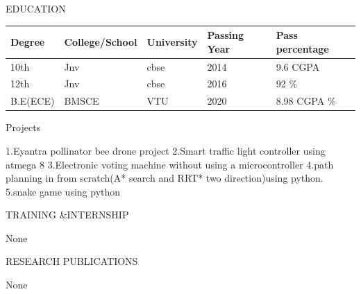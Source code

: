 \documentclass[10pt]{article}
\begin{document}
	\begin{minipage}[t][2cm][t]{0.2\textwidth}
	EDUCATION
		
	\end{minipage}
	\begin{minipage}[t][2cm][t]{0.8\textwidth}
		
	\begin{tabular}{ | l |  l |  l |  l |  l |} 
	\hline
	Degree & College/School & University & Passing Year & Pass percentage \\ 
	\hline
	\hline
	10th & Jnv & cbse & 2014 & 9.6 CGPA  \\ 
\hline
12th & Jnv & cbse & 2016 & 92 \%  \\ 
\hline
B.E(ECE) & BMSCE & VTU & 2020 & 8.98 CGPA \%  \\ 
\hline
	
	\end{tabular}
	\end{minipage}




	

	
	\begin{minipage}[t][2cm][t]{0.2\textwidth}
		Projects
		
	\end{minipage}
	\begin{minipage}[t][2cm][t]{0.8\textwidth}
		1.Eyantra pollinator bee drone project
		\newline 2.Smart traffic light controller using atmega 8
		\newline 3.Electronic voting machine without using a microcontroller
		\newline 4.path planning in from scratch(A* search and RRT* two direction)using python.
		\newline 5.snake game using python 
		
	\end{minipage}



	

	
	\begin{minipage}[t][2cm][t]{0.2\textwidth}
		TRAINING \&INTERNSHIP
		
	\end{minipage}
	\begin{minipage}[t][2cm][t]{0.8\textwidth}
		None

	\end{minipage}
	
		

		
	\begin{minipage}[t][2cm][t]{0.2\textwidth}
		RESEARCH PUBLICATIONS
		
	\end{minipage}
	\begin{minipage}[t][2cm][t]{0.8\textwidth}
		None
		
	\end{minipage}
\end{document}
